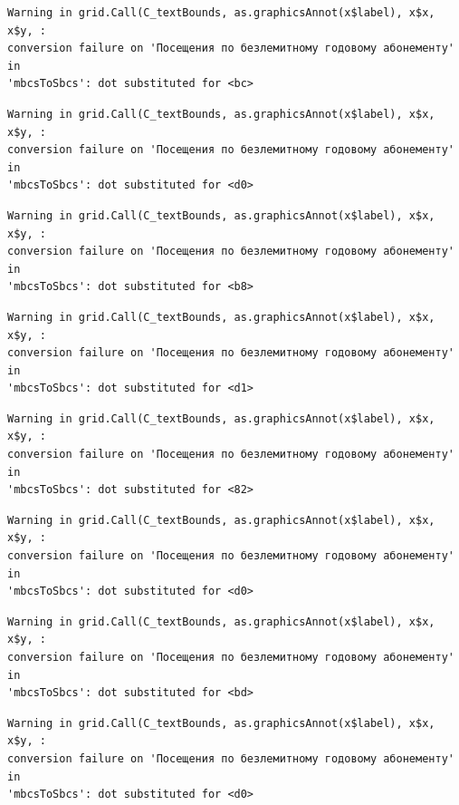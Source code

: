 \documentclass[
  letterpaper,
  DIV=11,
  numbers=noendperiod]{scrartcl}
\begin{document}
\begin{verbatim}
Warning in grid.Call(C_textBounds, as.graphicsAnnot(x$label), x$x, x$y, :
conversion failure on 'Посещения по безлемитному годовому абонементу' in
'mbcsToSbcs': dot substituted for <bc>
\end{verbatim}

\begin{verbatim}
Warning in grid.Call(C_textBounds, as.graphicsAnnot(x$label), x$x, x$y, :
conversion failure on 'Посещения по безлемитному годовому абонементу' in
'mbcsToSbcs': dot substituted for <d0>
\end{verbatim}

\begin{verbatim}
Warning in grid.Call(C_textBounds, as.graphicsAnnot(x$label), x$x, x$y, :
conversion failure on 'Посещения по безлемитному годовому абонементу' in
'mbcsToSbcs': dot substituted for <b8>
\end{verbatim}

\begin{verbatim}
Warning in grid.Call(C_textBounds, as.graphicsAnnot(x$label), x$x, x$y, :
conversion failure on 'Посещения по безлемитному годовому абонементу' in
'mbcsToSbcs': dot substituted for <d1>
\end{verbatim}

\begin{verbatim}
Warning in grid.Call(C_textBounds, as.graphicsAnnot(x$label), x$x, x$y, :
conversion failure on 'Посещения по безлемитному годовому абонементу' in
'mbcsToSbcs': dot substituted for <82>
\end{verbatim}

\begin{verbatim}
Warning in grid.Call(C_textBounds, as.graphicsAnnot(x$label), x$x, x$y, :
conversion failure on 'Посещения по безлемитному годовому абонементу' in
'mbcsToSbcs': dot substituted for <d0>
\end{verbatim}

\begin{verbatim}
Warning in grid.Call(C_textBounds, as.graphicsAnnot(x$label), x$x, x$y, :
conversion failure on 'Посещения по безлемитному годовому абонементу' in
'mbcsToSbcs': dot substituted for <bd>
\end{verbatim}

\begin{verbatim}
Warning in grid.Call(C_textBounds, as.graphicsAnnot(x$label), x$x, x$y, :
conversion failure on 'Посещения по безлемитному годовому абонементу' in
'mbcsToSbcs': dot substituted for <d0>
\end{verbatim}
\end{document}
